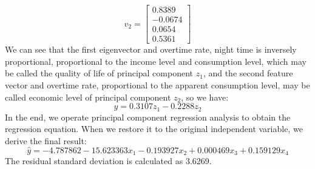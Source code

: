 \documentclass[UTF8]{article}
\begin{document}
\[v_2=\begin{bmatrix}
0.8389\\
-0.0674\\
0.0654\\
0.5361
\end{bmatrix}\]
\indent We can see that the first eigenvector and overtime rate, night time is inversely proportional, proportional to the income level and consumption level, which may be called the quality of life of principal component \(z_1\), and the second feature vector and overtime rate, proportional to the apparent consumption level, may be called economic level of principal component \(z_2\), so we have:\\
\[\hat{y}=0.3107z_1-0.2288z_2\]
\indent In the end, we operate principal component regression analysis to obtain the regression equation. When we restore it to the original independent variable, we derive the final result:
\[\hat{y}=-4.787862-15.623363x_1-0.193927x_2+0.000469x_3+0.159129x_4\]
\indent The residual standard deviation is calculated as 3.6269.
\newpage
\end{document}
